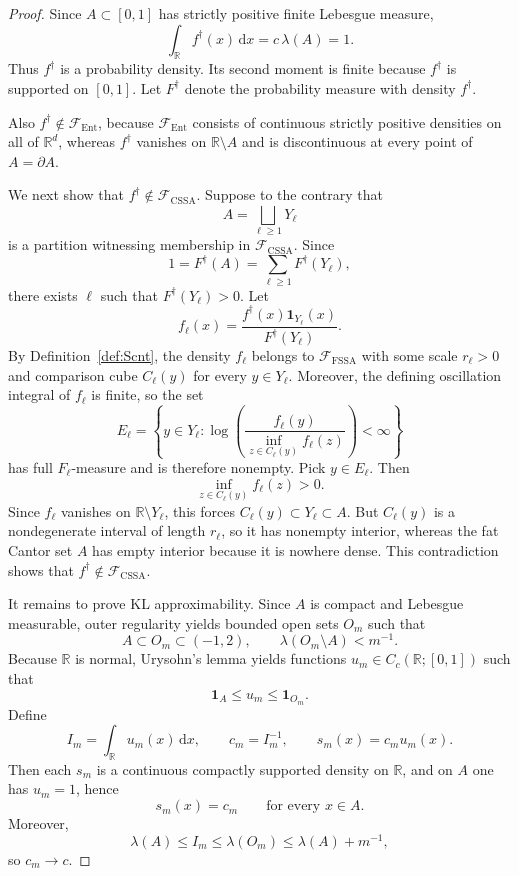 \documentclass[11pt]{article}
\theoremstyle{definition}
\begin{document}
\begin{proof}
Since $A\subset[0,1]$ has strictly positive finite Lebesgue measure,
\[
\int_{\mathbb{R}} f^{\dagger}(x)\,\mathrm{d}x
=c\,\lambda(A)=1.
\]
Thus $f^{\dagger}$ is a probability density. Its second moment is finite because $f^{\dagger}$ is supported on $[0,1]$. Let $F^{\dagger}$ denote the probability measure with density $f^{\dagger}$.

Also $f^{\dagger}\notin\mathcal F_{\mathrm{Ent}}$, because $\mathcal F_{\mathrm{Ent}}$ consists of continuous strictly positive densities on all of $\mathbb{R}^d$, whereas $f^{\dagger}$ vanishes on $\mathbb{R}\setminus A$ and is discontinuous at every point of $A=\partial A$.

We next show that $f^{\dagger}\notin\mathcal F_{\mathrm{CSSA}}$. Suppose to the contrary that
\[
A=\bigsqcup_{\ell\ge1} Y_\ell
\]
is a partition witnessing membership in $\mathcal F_{\mathrm{CSSA}}$. Since
\[
1=F^{\dagger}(A)=\sum_{\ell\ge1} F^{\dagger}(Y_\ell),
\]
there exists $\ell$ such that $F^{\dagger}(Y_\ell)>0$. Let
\[
f_\ell(x)=\frac{f^{\dagger}(x)\mathbf{1}_{Y_\ell}(x)}{F^{\dagger}(Y_\ell)}.
\]
By Definition~\ref{def:Scnt}, the density $f_\ell$ belongs to $\mathcal F_{\mathrm{FSSA}}$ with some scale $r_\ell>0$ and comparison cube $C_\ell(y)$ for every $y\in Y_\ell$. Moreover, the defining oscillation integral of $f_\ell$ is finite, so the set
\[
E_\ell=\left\{y\in Y_\ell: \log\!\left(\frac{f_\ell(y)}{\inf_{z\in C_\ell(y)}f_\ell(z)}\right)<\infty\right\}
\]
has full $F_\ell$-measure and is therefore nonempty. Pick $y\in E_\ell$. Then
\[
\inf_{z\in C_\ell(y)} f_\ell(z)>0.
\]
Since $f_\ell$ vanishes on $\mathbb{R}\setminus Y_\ell$, this forces $C_\ell(y)\subset Y_\ell\subset A$. But $C_\ell(y)$ is a nondegenerate interval of length $r_\ell$, so it has nonempty interior, whereas the fat Cantor set $A$ has empty interior because it is nowhere dense. This contradiction shows that $f^{\dagger}\notin\mathcal F_{\mathrm{CSSA}}$.

It remains to prove KL approximability. Since $A$ is compact and Lebesgue measurable, outer regularity yields bounded open sets $O_m$ such that
\[
A\subset O_m\subset (-1,2),
\qquad
\lambda(O_m\setminus A)<m^{-1}.
\]
Because $\mathbb{R}$ is normal, Urysohn's lemma yields functions $u_m\in C_c(\mathbb{R};[0,1])$ such that
\[
\mathbf{1}_A\le u_m\le \mathbf{1}_{O_m}.
\]
Define
\[
I_m=\int_{\mathbb{R}} u_m(x)\,\mathrm{d}x,
\qquad
c_m=I_m^{-1},
\qquad
s_m(x)=c_m u_m(x).
\]
Then each $s_m$ is a continuous compactly supported density on $\mathbb{R}$, and on $A$ one has $u_m=1$, hence
\[
s_m(x)=c_m
\qquad\text{for every }x\in A.
\]
Moreover,
\[
\lambda(A)\le I_m\le \lambda(O_m)\le \lambda(A)+m^{-1},
\]
so $c_m\to c$.


\end{proof}
\end{document}
